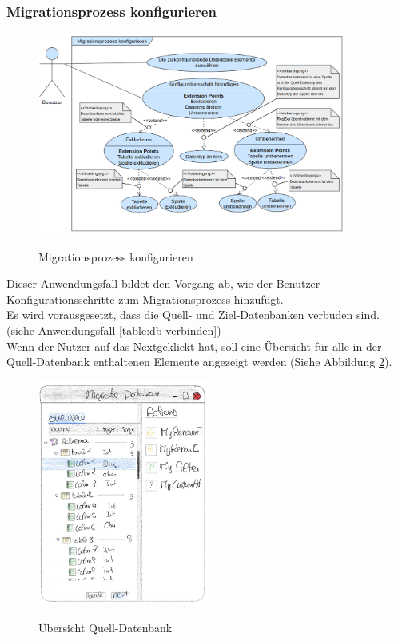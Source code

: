 	\subsubsection*{Migrationsprozess konfigurieren}
	\begin{figure}[H]
		\caption{Migrationsprozess konfigurieren}
		\centering
		\includegraphics[width=0.9\textwidth]{images/af/af-mg-cfg}
		\label{img:af-mg-cfg}
	\end{figure}
	Dieser Anwendungsfall bildet den Vorgang ab, wie der Benutzer Konfigurationsschritte zum Migrationsprozess hinzufügt.\\
	Es wird vorausgesetzt, dass die Quell- und Ziel-Datenbanken verbuden sind. (siehe Anwendungsfall \ref{table:db-verbinden})\\
	Wenn der Nutzer auf das \glqq Next\grqq geklickt hat, soll eine Übersicht für alle in der Quell-Datenbank enthaltenen Elemente angezeigt werden (Siehe Abbildung \ref{img:overview}).
	\begin{figure}[H]
		\caption{Übersicht Quell-Datenbank}
		\centering
		\includegraphics[width=0.5\textwidth]{images/overview}
		\label{img:overview}
	\end{figure}
